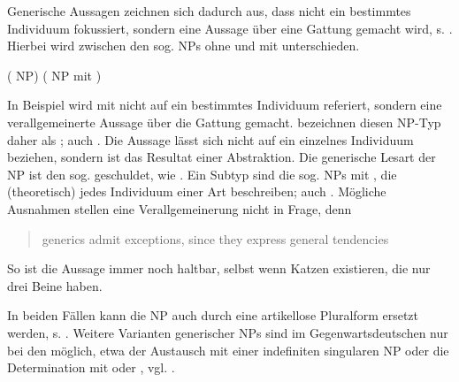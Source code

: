 
Generische Aussagen zeichnen sich dadurch aus, dass nicht ein bestimmtes Individuum fokussiert, sondern eine Aussage über eine Gattung gemacht wird, s.  \parencite[übersetzt und gekürzt aus][]{Krifka1995}. Hierbei wird zwischen den sog.  NPs ohne und mit  unterschieden.   

\begin{exe}
	\ex \label{ex:gener}   
	\begin{xlist}
		\ex \label{ex:sued}  ( NP)
		\ex \label{ex:vitc}  ( NP mit )
		\end{xlist}
\end{exe}

In Beispiel  wird mit  nicht auf ein bestimmtes Individuum referiert, sondern eine verallgemeinerte Aussage über die Gattung  gemacht. \textcite[2]{Krifka1995} bezeichnen diesen NP-Typ daher als ; auch  \parencite[138]{Bisle-Muller1991}. Die Aussage lässt sich nicht auf ein einzelnes Individuum beziehen, sondern ist das Resultat einer Abstraktion. Die generische Lesart der NP ist den sog.  geschuldet, wie  \parencite{Krifka1995}. Ein Subtyp sind die sog.  NPs mit , die (theoretisch) jedes Individuum einer Art beschreiben; auch   \parencite[139-140]{Bisle-Muller1991}. Mögliche Ausnahmen stellen eine Verallgemeinerung nicht in Frage, denn  \blockcquote[179]{Lyons1999}{generics admit exceptions, since they express general tendencies}. So ist die Aussage   immer noch haltbar, selbst wenn Katzen existieren, die nur drei Beine haben.

In beiden Fällen kann die NP auch durch eine artikellose Pluralform ersetzt werden, s. . 
Weitere Varianten generischer NPs sind im Gegenwartsdeutschen nur bei den  möglich, etwa der Austausch mit einer indefiniten singularen NP oder die Determination mit  oder  \parencite[296]{Duden2009}, vgl. . 


